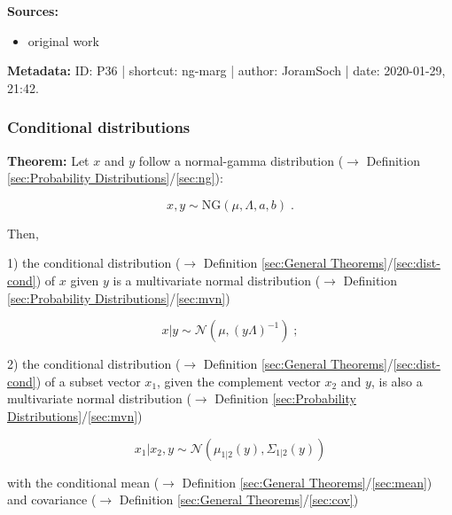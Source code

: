 \documentclass[a4paper,12pt,twoside]{book}
\begin{document}
\vspace{1em}
\textbf{Sources:}
\begin{itemize}
\item original work\end{itemize}


\vspace{1em}
\textbf{Metadata:} ID: P36 | shortcut: ng-marg | author: JoramSoch | date: 2020-01-29, 21:42.
\vspace{1em}



\subsubsection[\textbf{Conditional distributions}]{Conditional distributions} \label{sec:ng-cond}
\setcounter{equation}{0}

\textbf{Theorem:} Let $x$ and $y$ follow a normal-gamma distribution ($\rightarrow$ Definition \ref{sec:Probability Distributions}/\ref{sec:ng}):

\begin{equation} \label{eq:ng-cond-ng}
x,y \sim \mathrm{NG}(\mu, \Lambda, a, b) \; .
\end{equation}

Then,

1) the conditional distribution ($\rightarrow$ Definition \ref{sec:General Theorems}/\ref{sec:dist-cond}) of $x$ given $y$ is a multivariate normal distribution ($\rightarrow$ Definition \ref{sec:Probability Distributions}/\ref{sec:mvn})

\begin{equation} \label{eq:ng-cond-ng-cond-x-y}
x|y \sim \mathcal{N}(\mu, (y \Lambda)^{-1}) \; ;
\end{equation}

2) the conditional distribution ($\rightarrow$ Definition \ref{sec:General Theorems}/\ref{sec:dist-cond}) of a subset vector $x_1$, given the complement vector $x_2$ and $y$, is also a multivariate normal distribution ($\rightarrow$ Definition \ref{sec:Probability Distributions}/\ref{sec:mvn})

\begin{equation} \label{eq:ng-cond-ng-cond-x1-x2-y}
x_1|x_2,y \sim \mathcal{N}(\mu_{1|2}(y), \Sigma_{1|2}(y))
\end{equation}

with the conditional mean ($\rightarrow$ Definition \ref{sec:General Theorems}/\ref{sec:mean}) and covariance ($\rightarrow$ Definition \ref{sec:General Theorems}/\ref{sec:cov})
\end{document}
